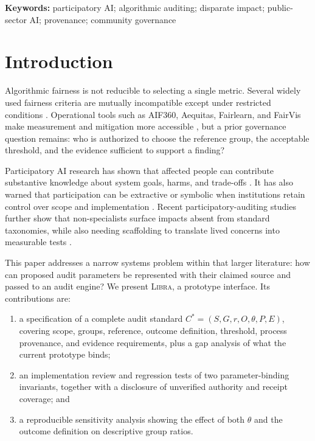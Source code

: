 \documentclass[10pt]{article}
\newcommand{\libra}{\textsc{Libra}}
\begin{document}
\noindent\textbf{Keywords:} participatory AI; algorithmic auditing; disparate
impact; public-sector AI; provenance; community governance

\section{Introduction}

Algorithmic fairness is not reducible to selecting a single metric. Several
widely used fairness criteria are mutually incompatible except under restricted
conditions \cite{chouldechova2017,kleinberg2017}. Operational tools such as
AIF360, Aequitas, Fairlearn, and FairVis make measurement and mitigation more
accessible \cite{bellamy2018,saleiro2018,weerts2023,cabrera2019}, but a prior
governance question remains: who is authorized to choose the reference group,
the acceptable threshold, and the evidence sufficient to support a finding?

Participatory AI research has shown that affected people can contribute
substantive knowledge about system goals, harms, and trade-offs
\cite{lee2019,katell2020,birhane2022}. It has also warned that participation can
be extractive or symbolic when institutions retain control over scope and
implementation \cite{sloane2022}. Recent participatory-auditing studies further
show that non-specialists surface impacts absent from standard taxonomies, while
also needing scaffolding to translate lived concerns into measurable tests
\cite{zhao2026,dicampli2026,rezk2026,escher2026}.

This paper addresses a narrow systems problem within that larger literature:
how can proposed audit parameters be represented with their claimed source and
passed to an audit engine? We present \libra, a prototype interface. Its
contributions are:

\begin{enumerate}
  \item a specification of a complete audit standard
  $C^*=(S,G,r,O,\theta,P,E)$, covering scope, groups, reference, outcome
  definition, threshold, process provenance, and evidence requirements, plus
  a gap analysis of what the current prototype binds;
  \item an implementation review and regression tests of two parameter-binding
  invariants, together with a disclosure of unverified authority and receipt
  coverage; and
  \item a reproducible sensitivity analysis showing the effect of both
  $\theta$ and the outcome definition on descriptive group ratios.
\end{enumerate}
\end{document}
